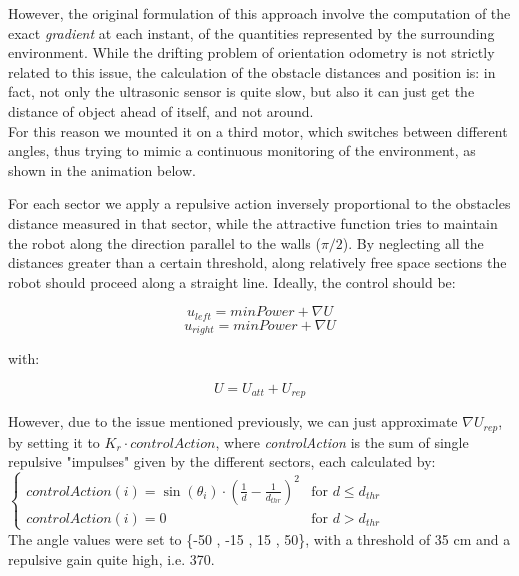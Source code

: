 \documentclass[a4paper,11pt,oneside]{book}
\begin{document}
			However, the original formulation of this approach involve the computation of the exact \emph{gradient} at each instant, of the quantities represented by the surrounding environment. While the drifting problem of orientation odometry is not strictly related to this issue, the calculation of the obstacle distances and position is: in fact, not only the ultrasonic sensor is quite slow, but also it can just get the distance of object ahead of itself, and not around.\\
			For this reason we mounted it on a third motor, which switches between different angles, thus trying to mimic a continuous monitoring of the environment, as shown in the animation below.
			
		
			\begin{center}	
			\end{center}
		
			
			For each sector we apply a repulsive action inversely proportional to the obstacles distance measured in that sector, while the attractive function tries to maintain the robot along the direction parallel to the walls ($\pi/2$). By neglecting all the distances greater than a certain threshold, along relatively free space sections the robot should proceed along a straight line. Ideally, the control should be:
			
				$$u_{left} = minPower + \nabla U$$
			    $$u_{right}= minPower + \nabla U$$
			    
			with:
			
				$$U = U_{att} + U_{rep} $$
				
			However, due to the issue mentioned previously, we can just approximate $\nabla U_{rep}$, by setting it to $K_{r} \cdot \mathit{controlAction}$, where \emph{controlAction} is the sum of single repulsive "impulses" given by the different sectors, each calculated by:\\ 
			$
			\begin{cases}
				controlAction(i) = \sin(\theta_{i}) \cdot (\frac{1}{d} - \frac{1}{d_{thr}})^2 & \text{for }d \le d_{thr}\\    
				controlAction(i) = 0 & \text{for } d > d_{thr}
			\end{cases}
			$\\
			
			The angle values were set to \{-50 , -15 , 15 , 50\}, with a threshold of 35 cm and a repulsive gain quite high, i.e. 370.
				
\end{document}
